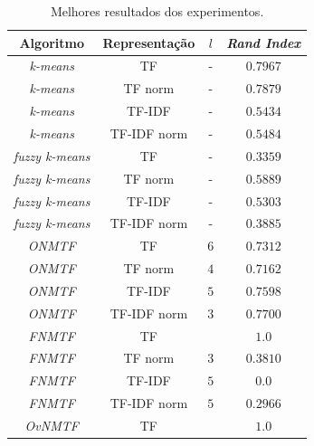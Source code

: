 \documentclass[
    12pt,                %
    oneside,            %
    a4paper,            %
    english,            %
    brazil                %
    ]{abntex2ppgsi}
\begin{document}
 \begin{table}[htpb]
 \centering
     \caption{Melhores resultados dos experimentos.}
         \begin{tabular}{c|c|c|c}
             \hline
             Algoritmo              & Representação & $l$ & \textit{Rand Index} \\
             \hline
             \textit{k-means}       & TF            & -   & $0.7967$            \\
             \textit{k-means}       & TF norm       & -   & $0.7879$            \\
             \textit{k-means}       & TF-IDF        & -   & $0.5434$            \\
             \textit{k-means}       & TF-IDF norm   & -   & $0.5484$            \\
             \hline
             \textit{fuzzy k-means} & TF            & -   & $0.3359$            \\
             \textit{fuzzy k-means} & TF norm       & -   & $0.5889$            \\
             \textit{fuzzy k-means} & TF-IDF        & -   & $0.5303$            \\
             \textit{fuzzy k-means} & TF-IDF norm   & -   & $0.3885$            \\
             \hline
             \textit{ONMTF}         & TF            & $6$ & $0.7312$            \\
             \textit{ONMTF}         & TF norm       & $4$ & $0.7162$            \\
             \textit{ONMTF}         & TF-IDF        & $5$ & $0.7598$            \\
             \textit{ONMTF}         & TF-IDF norm   & $3$ & $0.7700$            \\
             \hline
             \textit{FNMTF}         & TF            &     & $1.0$            \\
             \textit{FNMTF}         & TF norm       & $3$ & $0.3810$            \\
             \textit{FNMTF}         & TF-IDF        & $5$ & $0.0$            \\
             \textit{FNMTF}         & TF-IDF norm   & $5$ & $0.2966$            \\
             \hline
             \textit{OvNMTF}        & TF            &     & $1.0$            \\

\end{tabular}
\end{table}
\end{document}
